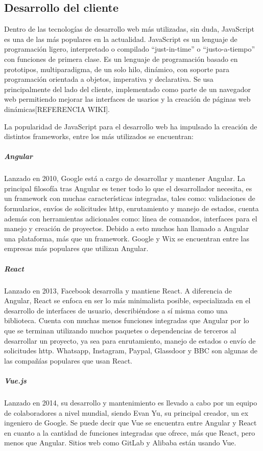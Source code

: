  


\subsection{Desarrollo del cliente}
Dentro de las tecnologías de desarrollo web más utilizadas, sin duda, 
JavaScript es una de las más populares en la actualidad. JavaScript es 
un lenguaje de programación ligero, interpretado o compilado ``just-in-time''
o ``justo-a-tiempo'' con funciones de primera clase. Es un lenguaje de programación
basado en prototipos, multiparadigma, de un solo hilo, dinámico, con
soporte para programación orientada a objetos, imperativa y declarativa.
Se usa principalmente del lado del cliente, implementado como parte de un navegador 
web permitiendo mejorar las interfaces de usarios y la creación de
páginas web dinámicas[REFERENCIA WIKI].

La popularidad de JavaScript para el desarrollo web ha impulsado
la creación de distintos frameworks, entre los más 
utilizados se encuentran:

\subparagraph{Angular}
Lanzado en 2010, Google está a cargo de desarrollar y 
mantener Angular. La principal filosofía tras Angular es 
tener todo lo que el desarrollador necesita, es un framework
con muchas características integradas, tales como: validaciones 
de formularios, envíos de solicitudes http, enrutamiento y 
manejo de estados, cuenta además con herramientas adicionales
como: línea de comandos, interfaces para el manejo y 
creación de proyectos. Debido a esto muchos han llamado a Angular
una plataforma, más que un framework. Google y Wix se 
encuentran entre las empresas más populares que utilizan
Angular.

\subparagraph{React}
Lanzado en 2013, Facebook desarrolla y mantiene React.
A diferencia de Angular, React se enfoca en ser lo más minimalista posible,
especializada en el desarrollo de interfaces de usuario, describiéndose
a sí misma como una biblioteca. Cuenta con muchas menos funciones integradas
que Angular por lo que se terminan utilizando muchos paquetes o
dependencias de terceros al desarrollar un proyecto, ya sea para enrutamiento, manejo de estados o
envío de solicitudes http.
Whatsapp, Instagram, Paypal, Glassdoor y BBC son algunas de 
las compañías populares que usan React.

\subparagraph{Vue.js}
Lanzado en 2014, su desarrollo y mantenimiento es llevado a 
cabo por un equipo de colaboradores a nivel mundial, siendo  
Evan Yu, su principal creador, un ex ingeniero de Google.
Se puede decir que Vue se encuentra entre Angular y React en cuanto 
a la cantidad de funciones integradas que ofrece, más que React, pero 
menos que Angular. Sitios web como GitLab y Alibaba están usando Vue. \\

